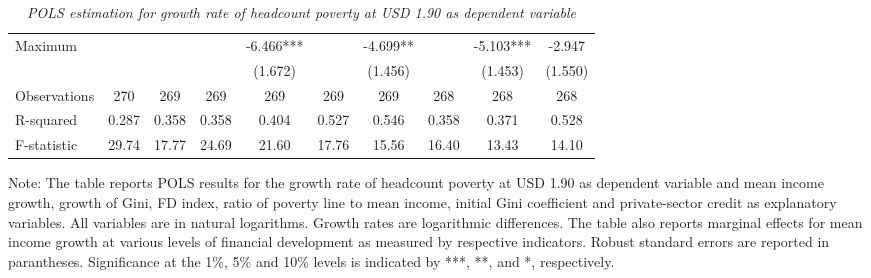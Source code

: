 \documentclass[12pt, a4paper]{article}
\begin{document}
\begin{table}[htbp]
\begin{threeparttable}
{\begin{tabular}{l*{9}{c}}
				Maximum	& & & & -6.466*** & & -4.699** & & -5.103*** & -2.947 \\
				& & & &  (1.672)  & & (1.456)  & & (1.453)  & (1.550) \\
				\hline 
				Observations        &         270         &         269         &         269         &         269         &         269         &         269         &         268         &         268         &         268         \\
				R-squared           &       0.287         &       0.358         &       0.358         &       0.404         &       0.527         &       0.546         &       0.358         &       0.371         &       0.528         \\
				F-statistic         &       29.74         &       17.77         &       24.69         &       21.60         &       17.76         &       15.56         &       16.40         &       13.43         &       14.10         \\
				\hline\hline
			\end{tabular}
		}
		\begin{tablenotes}
			\item \scriptsize{Note: The table reports POLS results for the growth rate of headcount poverty at USD 1.90 as dependent variable and mean income growth, growth of Gini, FD index, ratio of poverty line to mean income, initial Gini coefficient and private-sector credit as explanatory variables. All variables are in natural logarithms. Growth rates are logarithmic differences. The table also reports marginal effects for mean income growth at various levels of financial development as measured by respective indicators. Robust standard errors are reported in parantheses. Significance at the 1\%, 5\% and 10\% levels is indicated by ***, **, and *, respectively.}
		\end{tablenotes}
	\end{threeparttable}
	\caption[POLS Estimation Results for Headcount Poverty at USD 1.90]{\textit{POLS estimation for growth rate of headcount poverty at USD 1.90 as dependent variable}}
	\label{POLS190}
\end{table}
\end{document}
